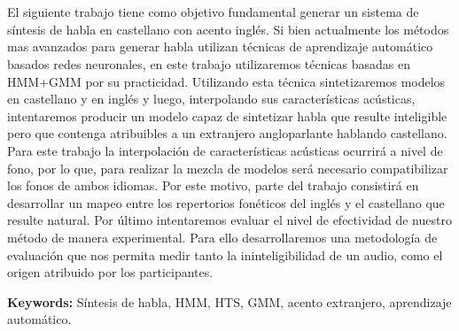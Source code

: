 \chapter*{\runtitle}

El siguiente trabajo tiene como objetivo fundamental generar un sistema de síntesis de habla en castellano con acento inglés. Si bien actualmente los métodos mas avanzados para generar habla utilizan técnicas de aprendizaje automático basados redes neuronales, en este trabajo utilizaremos técnicas basadas en HMM+GMM por su practicidad. Utilizando esta técnica sintetizaremos modelos en castellano y en inglés y luego, interpolando sus características acústicas, intentaremos producir un modelo capaz de sintetizar habla que resulte inteligible pero que contenga atribuibles a un extranjero angloparlante hablando castellano. Para este trabajo la interpolación de características acústicas ocurrirá a nivel de fono, por lo que, para realizar la mezcla de modelos será necesario compatibilizar los fonos de ambos idiomas. Por este motivo, parte del trabajo consistirá en desarrollar un mapeo entre los repertorios fonéticos del inglés y el castellano que resulte natural. Por último intentaremos evaluar el nivel de efectividad de nuestro método de manera experimental. Para ello desarrollaremos una metodología de evaluación que nos permita medir tanto la ininteligibilidad de un audio, como el origen atribuido por los participantes.

\bigskip

\noindent\textbf{Keywords:} Síntesis de habla, HMM, HTS, GMM, acento extranjero, aprendizaje automático.